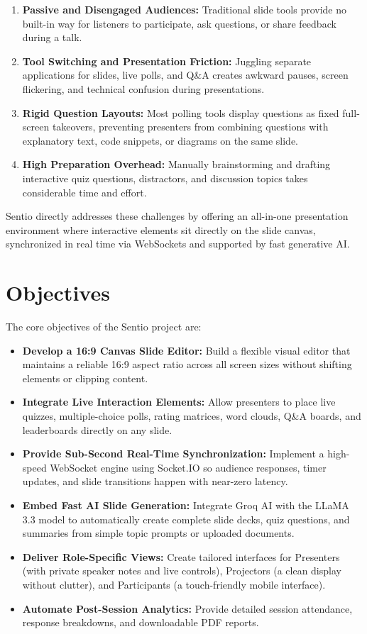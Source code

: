 \begin{enumerate}
    \item \textbf{Passive and Disengaged Audiences:} Traditional slide tools provide no built-in way for listeners to participate, ask questions, or share feedback during a talk.
    \item \textbf{Tool Switching and Presentation Friction:} Juggling separate applications for slides, live polls, and Q\&A creates awkward pauses, screen flickering, and technical confusion during presentations.
    \item \textbf{Rigid Question Layouts:} Most polling tools display questions as fixed full-screen takeovers, preventing presenters from combining questions with explanatory text, code snippets, or diagrams on the same slide.
    \item \textbf{High Preparation Overhead:} Manually brainstorming and drafting interactive quiz questions, distractors, and discussion topics takes considerable time and effort.
\end{enumerate}

Sentio directly addresses these challenges by offering an all-in-one presentation environment where interactive elements sit directly on the slide canvas, synchronized in real time via WebSockets and supported by fast generative AI.

\section{Objectives}

The core objectives of the Sentio project are:

\begin{itemize}
    \item \textbf{Develop a 16:9 Canvas Slide Editor:} Build a flexible visual editor that maintains a reliable 16:9 aspect ratio across all screen sizes without shifting elements or clipping content.
    \item \textbf{Integrate Live Interaction Elements:} Allow presenters to place live quizzes, multiple-choice polls, rating matrices, word clouds, Q\&A boards, and leaderboards directly on any slide.
    \item \textbf{Provide Sub-Second Real-Time Synchronization:} Implement a high-speed WebSocket engine using Socket.IO so audience responses, timer updates, and slide transitions happen with near-zero latency.
    \item \textbf{Embed Fast AI Slide Generation:} Integrate Groq AI with the LLaMA 3.3 model to automatically create complete slide decks, quiz questions, and summaries from simple topic prompts or uploaded documents.
    \item \textbf{Deliver Role-Specific Views:} Create tailored interfaces for Presenters (with private speaker notes and live controls), Projectors (a clean display without clutter), and Participants (a touch-friendly mobile interface).
    \item \textbf{Automate Post-Session Analytics:} Provide detailed session attendance, response breakdowns, and downloadable PDF reports.
\end{itemize}

